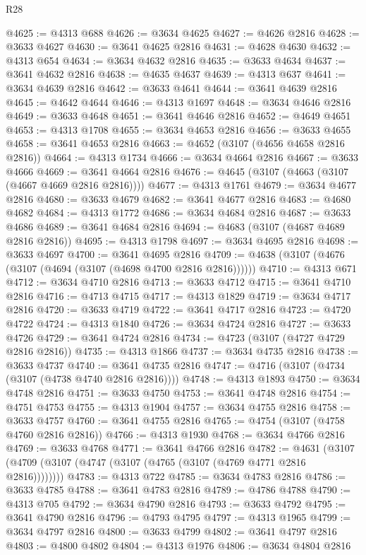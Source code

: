 \begin{lexlean}{R28}
\begin{coremodule}
@4625 := @4313 @688
@4626 := @3634 @4625
@4627 := @4626 @2816
@4628 := @3633 @4627
@4630 := @3641 @4625 @2816
@4631 := @4628 @4630
@4632 := @4313 @654
@4634 := @3634 @4632 @2816
@4635 := @3633 @4634
@4637 := @3641 @4632 @2816
@4638 := @4635 @4637
@4639 := @4313 @637
@4641 := @3634 @4639 @2816
@4642 := @3633 @4641
@4644 := @3641 @4639 @2816
@4645 := @4642 @4644
@4646 := @4313 @1697
@4648 := @3634 @4646 @2816
@4649 := @3633 @4648
@4651 := @3641 @4646 @2816
@4652 := @4649 @4651
@4653 := @4313 @1708
@4655 := @3634 @4653 @2816
@4656 := @3633 @4655
@4658 := @3641 @4653 @2816
@4663 := @4652 (@3107 (@4656 @4658 @2816 @2816))
@4664 := @4313 @1734
@4666 := @3634 @4664 @2816
@4667 := @3633 @4666
@4669 := @3641 @4664 @2816
@4676 := @4645 (@3107 (@4663 (@3107 (@4667 @4669 @2816 @2816))))
@4677 := @4313 @1761
@4679 := @3634 @4677 @2816
@4680 := @3633 @4679
@4682 := @3641 @4677 @2816
@4683 := @4680 @4682
@4684 := @4313 @1772
@4686 := @3634 @4684 @2816
@4687 := @3633 @4686
@4689 := @3641 @4684 @2816
@4694 := @4683 (@3107 (@4687 @4689 @2816 @2816))
@4695 := @4313 @1798
@4697 := @3634 @4695 @2816
@4698 := @3633 @4697
@4700 := @3641 @4695 @2816
@4709 := @4638 (@3107 (@4676 (@3107 (@4694 (@3107 (@4698 @4700 @2816 @2816))))))
@4710 := @4313 @671
@4712 := @3634 @4710 @2816
@4713 := @3633 @4712
@4715 := @3641 @4710 @2816
@4716 := @4713 @4715
@4717 := @4313 @1829
@4719 := @3634 @4717 @2816
@4720 := @3633 @4719
@4722 := @3641 @4717 @2816
@4723 := @4720 @4722
@4724 := @4313 @1840
@4726 := @3634 @4724 @2816
@4727 := @3633 @4726
@4729 := @3641 @4724 @2816
@4734 := @4723 (@3107 (@4727 @4729 @2816 @2816))
@4735 := @4313 @1866
@4737 := @3634 @4735 @2816
@4738 := @3633 @4737
@4740 := @3641 @4735 @2816
@4747 := @4716 (@3107 (@4734 (@3107 (@4738 @4740 @2816 @2816))))
@4748 := @4313 @1893
@4750 := @3634 @4748 @2816
@4751 := @3633 @4750
@4753 := @3641 @4748 @2816
@4754 := @4751 @4753
@4755 := @4313 @1904
@4757 := @3634 @4755 @2816
@4758 := @3633 @4757
@4760 := @3641 @4755 @2816
@4765 := @4754 (@3107 (@4758 @4760 @2816 @2816))
@4766 := @4313 @1930
@4768 := @3634 @4766 @2816
@4769 := @3633 @4768
@4771 := @3641 @4766 @2816
@4782 := @4631 (@3107 (@4709 (@3107 (@4747 (@3107 (@4765 (@3107 (@4769 @4771 @2816 @2816))))))))
@4783 := @4313 @722
@4785 := @3634 @4783 @2816
@4786 := @3633 @4785
@4788 := @3641 @4783 @2816
@4789 := @4786 @4788
@4790 := @4313 @705
@4792 := @3634 @4790 @2816
@4793 := @3633 @4792
@4795 := @3641 @4790 @2816
@4796 := @4793 @4795
@4797 := @4313 @1965
@4799 := @3634 @4797 @2816
@4800 := @3633 @4799
@4802 := @3641 @4797 @2816
@4803 := @4800 @4802
@4804 := @4313 @1976
@4806 := @3634 @4804 @2816

\end{coremodule}
\end{lexlean}
